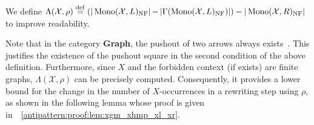 \begin{definition}
\begin{itemize}
\begin{center}
{
         }
        \end{center}
    \end{itemize}
    We define $\Lambda(\mathcal{X},\rho) \overset{\operatorname{def}}{=} (|\operatorname{Mono}(\mathcal{X},L)_{\operatorname{NF}}| \mathop{-} 
    |\Gamma(\operatorname{Mono}(\mathcal{X},L)_{\operatorname{NF}})|) -
   |\operatorname{Mono}(\mathcal{X},R)_{\operatorname{NF}}|$ to improve readability.
\end{definition}
Note that in the category \textbf{Graph}, the pushout of two arrows always exists~\cite[p.188]{corradini1997algebraic}. This justifies the existence of the pushout square in the second condition of the above definition.
Furthermore, since $X$ and the forbidden context (if exists) are finite graphs, $\Lambda(\mathcal{X},\rho)$ can be precisely computed. Consequently, it provides a lower bound for the change in the number of $X$-occurrences in a rewriting step using $\rho$, as shown in the following lemma whose proof is given in~\textsection~\ref{antipattern:proof:lem:xgm_xhmp_xl_xr}.

